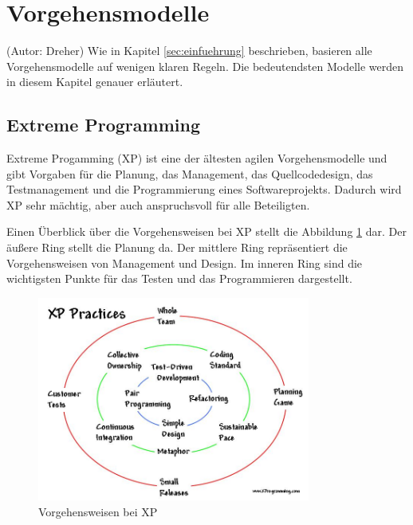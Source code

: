 \section{Vorgehensmodelle}
(Autor: Dreher)
Wie in Kapitel \ref{sec:einfuehrung} beschrieben, basieren alle Vorgehensmodelle auf wenigen klaren Regeln. Die bedeutendsten Modelle werden in diesem Kapitel genauer erläutert.

\subsection{Extreme Programming}
Extreme Progamming (XP) ist eine der ältesten agilen Vorgehensmodelle und gibt Vorgaben für die Planung, das Management, das Quellcodedesign, das Testmanagement und die Programmierung eines Softwareprojekts. Dadurch wird XP sehr mächtig, aber auch anspruchsvoll für alle Beteiligten. \cite{bib:wolfRoock} \cite{bib:xp}

Einen Überblick über die Vorgehensweisen bei XP stellt die Abbildung \ref{fig:xppractices} dar. Der äußere Ring stellt die Planung da. Der mittlere Ring repräsentiert die Vorgehensweisen von Management und Design. Im inneren Ring sind die wichtigsten Punkte für das Testen und das Programmieren dargestellt.

\begin{figure}[h]
  \centering
  \includegraphics[width=0.8\textwidth]{images/xpCircles}
  \caption{Vorgehensweisen bei XP \cite{bib:xprogamming}}
  \label{fig:xppractices}
\end{figure}

